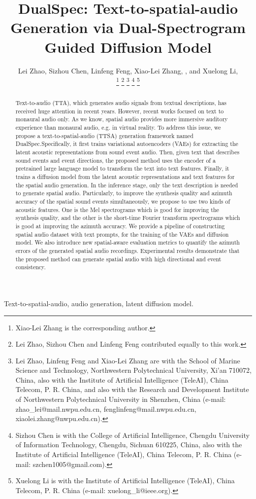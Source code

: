 \documentclass{IEEEtran}
\title{DualSpec: Text-to-spatial-audio Generation via Dual-Spectrogram Guided Diffusion Model}
\author{
    {Lei Zhao, Sizhou Chen, Linfeng Feng, Xiao-Lei Zhang, \IEEEmembership{Senior Member, IEEE}, and Xuelong Li, \IEEEmembership{Fellow, IEEE}}

    \thanks{Xiao-Lei Zhang is the corresponding author.}
    \thanks{Lei Zhao, Sizhou Chen and Linfeng Feng contributed equally to this work.}
    \thanks{Lei Zhao, Linfeng Feng and Xiao-Lei Zhang are with the School of Marine Science and Technology, Northwestern Polytechnical University, Xi’an 710072, China, also with the Institute of Artificial Intelligence (TeleAI), China Telecom, P. R. China, and also with the Research and Development Institute of Northwestern Polytechnical University in Shenzhen, China (e-mail: zhao\_lei@mail.nwpu.edu.cn, fenglinfeng@mail.nwpu.edu.cn, xiaolei.zhang@nwpu.edu.cn).}
    \thanks{Sizhou Chen is with the College of Artificial Intelligence, Chengdu University of Information Technology, Chengdu, Sichuan 610225, China, also with the Institute of Artificial Intelligence (TeleAI), China Telecom, P. R. China (e-mail: szchen1005@gmail.com).}
    \thanks{Xuelong Li is with the Institute of Artificial Intelligence (TeleAI), China Telecom, P. R. China (e-mail: xuelong\_li@ieee.org).}

}
\begin{document}
\maketitle

\begin{abstract}
Text-to-audio (TTA), which generates audio signals from textual descriptions, has received huge attention in recent years. However, recent works focused on text to monaural audio only. As we know, spatial audio provides more immersive auditory experience than monaural audio, e.g. in virtual reality. To address this issue, we propose a text-to-spatial-audio (TTSA) generation framework named DualSpec.Specifically, it first trains variational autoencoders (VAEs) for extracting the latent acoustic representations from sound event audio. Then, given text that describes sound events and event directions, the proposed method uses the encoder of a pretrained large language model to transform the text into text features. Finally, it trains a diffusion model from the latent acoustic representations and text features for the spatial audio generation. In the inference stage, only the text description is needed to generate spatial audio. Particularly, to improve the synthesis quality and azimuth accuracy of the spatial sound events simultaneously, we propose to use two kinds of acoustic features. One is the Mel spectrograms which is good for improving the synthesis quality, and the other is the short-time Fourier transform spectrograms which is good at improving the azimuth accuracy. We provide a pipeline of constructing spatial audio dataset with text prompts, for the training of the VAEs and diffusion model. We also introduce new spatial-aware evaluation metrics to quantify the azimuth errors of the generated spatial audio recordings. Experimental results demonstrate that the proposed method can generate spatial audio with high directional and event consistency.
\end{abstract}

\begin{IEEEkeywords}
    Text-to-spatial-audio, audio generation, latent diffusion model.
\end{IEEEkeywords}
\end{document}
